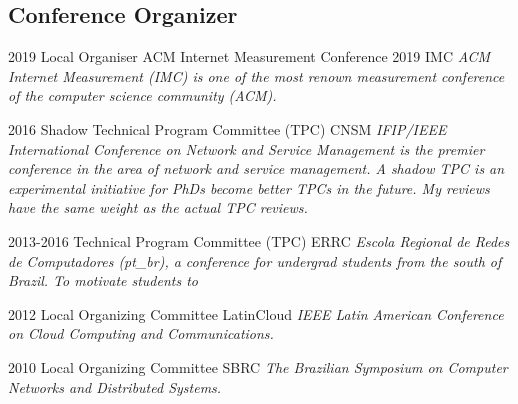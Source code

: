 \documentclass[print]{styles/friggeri-cv-linux} %
\begin{document}
\subsection{Conference Organizer}\vspace{-5pt}

\begin{entrylist}
\entry
{2019} 
{Local Organiser ACM Internet Measurement Conference 2019}
{IMC}
{\textit{ACM Internet Measurement (IMC) is one of the most renown measurement conference of the computer science community (ACM).}}

\entry
{2016} 
{Shadow Technical Program Committee (TPC)}
{CNSM}
{\textit{IFIP/IEEE International Conference on Network and Service Management is
the premier conference in the area of network and service management. A shadow
TPC is an experimental initiative for PhDs become better TPCs in the future. My
reviews have the same weight as the actual TPC reviews.}}

\entry
{2013-2016} 
{Technical Program Committee (TPC)}
{ERRC}
{\textit{Escola Regional de Redes de Computadores (pt\_br), a conference for
undergrad students from the south of Brazil. To motivate students to }}

\entry
{2012} 
{Local Organizing Committee}
{LatinCloud}
{\textit{IEEE Latin American Conference on Cloud Computing and Communications.}}

\entry
{2010}
{Local Organizing Committee}
{SBRC}
{\textit{The Brazilian Symposium on Computer Networks and Distributed Systems.}}

\end{entrylist}


\end{document}
